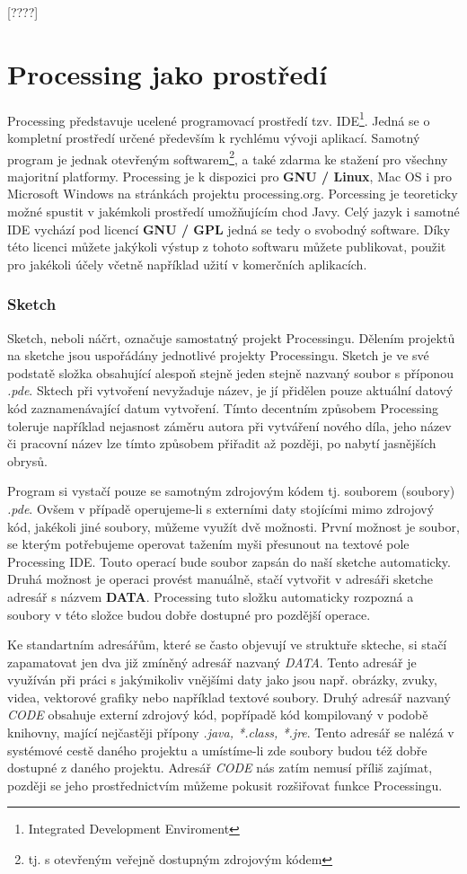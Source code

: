 \documentclass[11pt]{book}
\newcommand{\pododdil}[1]{\subsection{#1}\label{subsec:#1}}
\newcommand{\slovnik}[1]{\textbf{\gls{#1}}\index{#1}}
\begin{document}
[????]

\chapter{Processing jako prostředí}


Processing představuje ucelené programovací prostředí tzv. IDE\footnote{Integrated Development Enviroment}. Jedná se o kompletní prostředí určené především k rychlému vývoji aplikací. Samotný program je jednak otevřeným softwarem\footnote{tj. s otevřeným veřejně dostupným zdrojovým kódem}, a také zdarma ke stažení pro všechny majoritní platformy. Processing je k dispozici pro \slovnik{GNU / Linux}, Mac OS i pro Microsoft Windows na stránkách projektu processing.org. Porcessing je teoreticky možné spustit v jakémkoli prostředí umožňujícím chod Javy. Celý jazyk i samotné IDE vychází pod licencí \slovnik{GNU / GPL} jedná se tedy o svobodný software. Díky této licenci můžete jakýkoli výstup z tohoto softwaru můžete publikovat, použit pro jakékoli účely včetně například užití v komerčních aplikacích.


\pododdil{Sketch}

Sketch, neboli náčrt, označuje samostatný projekt Processingu. Dělením projektů na sketche jsou uspořádány jednotlivé projekty Processingu. Sketch je ve své podstatě složka obsahující alespoň stejně jeden stejně nazvaný soubor s příponou {\em *.pde}. Sktech při vytvoření nevyžaduje název, je jí přidělen pouze aktuální datový kód zaznamenávající datum vytvoření. Tímto decentním způsobem Processing toleruje například nejasnost záměru autora při vytváření nového díla, jeho název či pracovní název lze tímto způsobem přiřadit až později, po nabytí jasnějších obrysů.

Program si vystačí pouze se samotným zdrojovým kódem tj. souborem (soubory) {\em *.pde}. Ovšem v případě operujeme-li s externími daty stojícími mimo zdrojový kód, jakékoli jiné soubory, můžeme využít dvě možnosti. První možnost je soubor, se kterým potřebujeme operovat tažením myši přesunout na textové pole Processing IDE. Touto operací bude soubor zapsán do naší sketche automaticky. Druhá možnost je operaci provést manuálně, stačí vytvořit v adresáři sketche adresář s názvem \slovnik{DATA}. Processing tuto složku automaticky rozpozná a soubory v této složce budou dobře dostupné pro pozdější operace.

Ke standartním adresářům, které se často objevují ve struktuře skteche, si stačí zapamatovat jen dva již zmíněný adresář nazvaný {\em DATA}. Tento adresář je využíván při práci s jakýmikoliv vnějšími daty jako jsou např. obrázky, zvuky, videa, vektorové grafiky nebo například textové soubory. Druhý adresář nazvaný {\em CODE} obsahuje externí zdrojový kód, popřípadě kód kompilovaný v podobě knihovny, mající nejčastěji přípony {\em *.java, *.class, *.jre}. Tento adresář se nalézá v systémové cestě daného projektu a umístíme-li zde soubory budou též dobře dostupné z daného projektu. Adresář {\em CODE} nás zatím nemusí příliš zajímat, později se jeho prostřednictvím můžeme pokusit rozšiřovat funkce Processingu.
\end{document}
